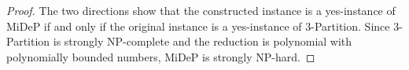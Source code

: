 \documentclass[subscriptcorrection,upint,nolists, varvw,barcolor=Goldenrod3,mathalfa=cal=euler,balance,hyphenate,french]{asmejour} %
\begin{document}
\begin{proof}
The two directions show that the constructed instance is a yes-instance of MiDeP if and only if the original instance is a yes-instance of 3-Partition. Since 3-Partition is strongly NP-complete and the reduction is polynomial with polynomially bounded numbers, MiDeP is strongly NP-hard.
\end{proof}



   

\end{document}
